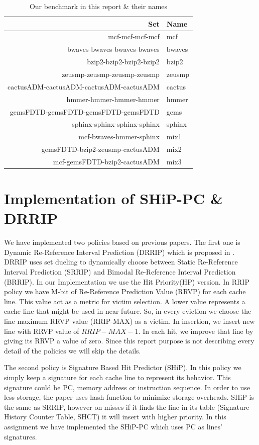 \documentclass{article}
\begin{document}
\begin{table}
\centering
\begin{tabular}{|| r | l ||}
  \hline
  Set & Name \\ [0.5ex] 
  \hline \hline
  mcf-mcf-mcf-mcf & mcf \\
  bwaves-bwaves-bwaves-bwaves & bwaves\\
  bzip2-bzip2-bzip2-bzip2 & bzip2 \\
  zeusmp-zeusmp-zeusmp-zeusmp & zeusmp \\
  cactusADM-cactusADM-cactusADM-cactusADM & cactus \\
  hmmer-hmmer-hmmer-hmmer & hmmer \\
  gemsFDTD-gemsFDTD-gemsFDTD-gemsFDTD & gems \\
  sphinx-sphinx-sphinx-sphinx & sphinx \\
  mcf-bwaves-hmmer-sphinx & mix1 \\
  gemsFDTD-bzip2-zeusmp-cactusADM & mix2 \\
  mcf-gemsFDTD-bzip2-cactusADM & mix3 \\
  \hline \hline
\end{tabular}
\caption{Our benchmark in this report \& their names}
\label{table_bench}
\end{table}


\section{Implementation of SHiP-PC \& DRRIP}
We have implemented two policies based on previous papers. The first one is Dynamic Re-Reference Interval Prediction (DRRIP) which is proposed in \cite{rrip}. DRRIP uses set dueling to dynamically choose between Static Re-Reference Interval Prediction (SRRIP) and Bimodal Re-Reference Interval Prediction (BRRIP). In our Implementation we use the Hit Priority(HP) version. In RRIP policy we have M-bit of Re-Reference Prediction Value (RRVP) for each cache line. This value act as a metric for victim selection. A lower value represents a cache line that might be used in near-future. So, in every eviction we choose the line maximum RRVP value (RRIP-MAX) as a victim. In insertion, we insert new line with RRVP value of $RRIP-MAX-1$. In each hit, we improve that line by giving its RRVP a value of zero. Since this report purpose is not describing every detail of the policies we will skip the details.

The second policy is Signature Based Hit Predictor (SHiP)\cite{ship}. In this policy we simply keep a signature for each cache line to represent its behavior. This signature could be PC, memory address or instruction sequence. In order to use less storage, the paper uses hash function to minimize storage overheads. SHiP is the same as SRRIP, however on misses if it finds the line in its table (Signature History Counter Table, SHCT) it will insert with higher priority. In this assignment we have implemented the SHiP-PC which uses PC as lines' signatures.
\end{document}
